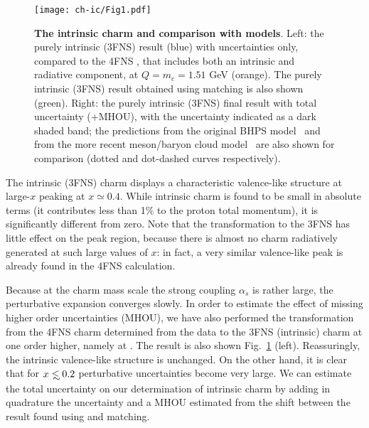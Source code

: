 \begin{figure}[h]
  \begin{center}
    \texttt{[image: ch-ic/Fig1.pdf]}
    \caption{\small  \textbf{ The intrinsic charm \pdf
      and comparison with models}.
%
      Left: the purely
      intrinsic (3FNS) result (blue)
      with \pdf uncertainties only, compared to the 4FNS \pdf, that
      includes both an intrinsic and radiative
      component,   at
      $Q=m_c=1.51$ GeV (orange). The purely intrinsic (3FNS)
      result obtained using \nnnlo matching is also shown (green).
      Right: the purely
      intrinsic (3FNS)
      final result with total uncertainty (\pdf+MHOU), with the \pdf
      uncertainty indicated as a dark shaded band;
the predictions from the original 
BHPS model~\cite{Brodsky:1980pb} and from the more recent meson/baryon
      cloud model~\cite{Hobbs:2013bia} are also shown for comparison
      (dotted and dot-dashed curves respectively).
         \label{fig:ic/charm_content_3fns} }
\end{center}
\end{figure}

The intrinsic (3FNS) charm \pdf
displays a characteristic valence-like
 structure at large-$x$ peaking at $x\simeq 0.4$.
%
 While intrinsic charm is found to be small in absolute terms
 (it contributes less than 1\% to the proton  total momentum),
 it is significantly different from zero.
%
 Note that the transformation to the 3FNS has little effect on the peak region,
 because there is almost no charm radiatively generated at such large values of $x$: in
 fact, a very similar valence-like peak is already found in the 4FNS calculation.

Because at the charm mass scale the strong coupling $\alpha_s$ is rather
large, the perturbative expansion converges slowly.
%
In order to
estimate the effect of missing higher order uncertainties (MHOU), we
have also performed the transformation from the 4FNS \nnlo charm \pdf
determined from the data to the 3FNS (intrinsic) charm \pdf at one
order higher, namely at \nnnlo. 
%
The result is also shown
Fig.~\ref{fig:ic/charm_content_3fns} (left). Reassuringly, the intrinsic
valence-like structure is unchanged.
%
On the other hand, it is clear that for
$x\lsim 0.2$ perturbative uncertainties become very large.
%
We can estimate  the total uncertainty on our determination
of intrinsic charm by adding in quadrature the \pdf uncertainty and a
MHOU estimated from the shift between the result found using \nnlo
and \nnnlo matching.

